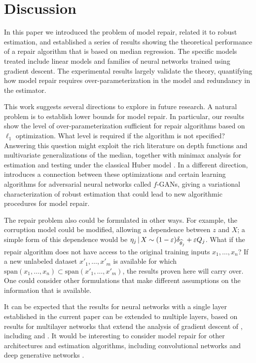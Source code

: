 
\def\ones{{\mathds{1}}}

\section{Discussion}
\label{sec:discuss}

In this paper we introduced the problem of model repair, related it to robust estimation, and established a series of results showing the theoretical performance of a repair algorithm that is based on median regression. The specific models treated include linear models and families of neural networks trained using gradient descent. The experimental results largely validate the theory, quantifying how model repair requires over-parameterization in the model and redundancy in the estimator.

This work suggests several directions to explore in future research.  A natural problem is to establish lower bounds for  model repair. In particular, our results show the level of over-parameterization sufficient for repair algorithms based on $\ell_1$ optimization. What level is required if the algorithm is not specified? Answering this question might exploit the rich literature on depth functions and multivariate generalizations of the median, together with minimax analysis for estimation and testing under the classical Huber model \citep{chen2018robust,diakonikolas,diakonikolas:2017}. In a different direction, \cite{gao2018robust} introduces a connection between these optimizations and certain learning algorithms for adversarial neural networks called $f$-GANs, giving a variational characterization of robust estimation that could lead to new algorithmic procedures for model repair.


The repair problem also could be formulated in other ways.  For example,
the corruption model could be modified, allowing a dependence between $z$ and $X$;
a simple form of this dependence would be $\eta_j \,|\, X \sim (1-\varepsilon) \delta_{\widehat\theta_j} + \varepsilon Q_j$.
What if the repair algorithm does not have access to the original training inputs $x_1,\ldots, x_n$?
If a new unlabeled dataset $x'_1,\ldots, x'_{m}$ is available for which $\text{span}(x_1,\ldots,x_n) \subset \text{span}(x'_1,\ldots,x'_{m})$, the results proven here will carry over. One could consider other formulations that make different assumptions on the information that is available.

It can be expected that the results for neural networks with a single layer established in the current paper
can be extended to multiple layers, based on results for multilayer networks that extend the analysis of gradient descent
of \cite{du2018gradient}, including \cite{zhuli} and \cite{dulee}. It would be interesting to
consider model repair for other architectures and estimation algorithms, including convolutional networks
and deep generative networks \citep{goodfellow2014generative,nvp,glow}.

